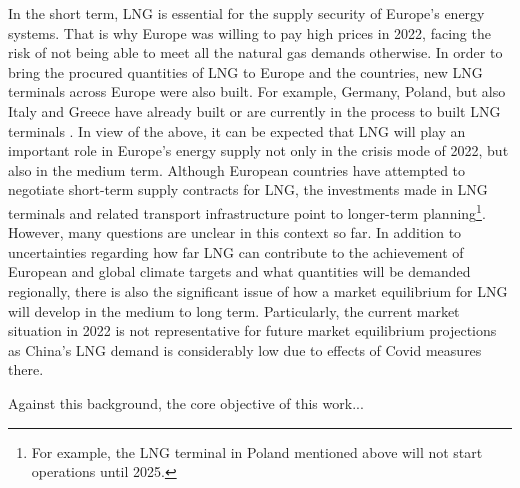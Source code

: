 In the short term, LNG is essential for the supply security of Europe's energy systems. That is why Europe was willing to pay high prices in 2022, facing the risk of not being able to meet all the natural gas demands otherwise. In order to bring the procured quantities of LNG to Europe and the countries, new LNG terminals across Europe were also built. For example, Germany, Poland, but also Italy and Greece have already built or are currently in the process to built LNG terminals \cite{lng_terminals}. In view of the above, it can be expected that LNG will play an important role in Europe's energy supply not only in the crisis mode of 2022, but also in the medium term. Although European countries have attempted to negotiate short-term supply contracts for LNG, the investments made in LNG terminals and related transport infrastructure point to longer-term planning\footnote{For example, the LNG terminal in Poland mentioned above will not start operations until 2025.}. However, many questions are unclear in this context so far. In addition to uncertainties regarding how far LNG can contribute to the achievement of European and global climate targets and what quantities will be demanded regionally, there is also the significant issue of how a market equilibrium for LNG will develop in the medium to long term. Particularly, the current market situation in 2022 is not representative for future market equilibrium projections as China's LNG demand is considerably low due to effects of Covid measures there.\vspace{0.35cm}    

Against this background, the core objective of this work...